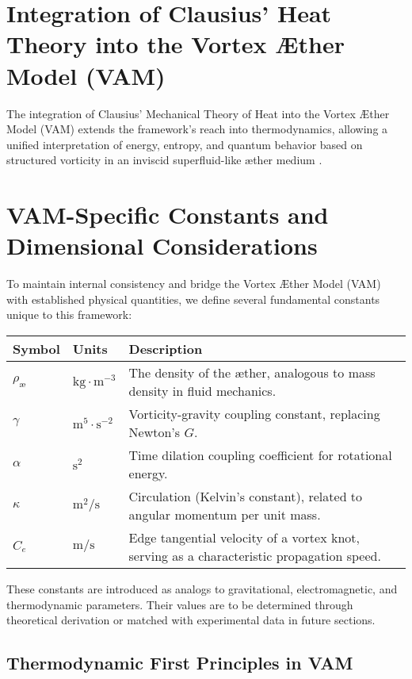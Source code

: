 

\section{Integration of Clausius' Heat Theory into the Vortex \AE ther Model (VAM)}

The integration of Clausius' Mechanical Theory of Heat into the Vortex \AE ther Model (VAM) extends the framework's reach into thermodynamics,
allowing a unified interpretation of energy, entropy, and quantum behavior based on structured vorticity in an inviscid superfluid-like \ae ther
medium \cite{clausius1865mechanical, maxwell1865electromagnetic, helmholtz1858integrals}.

\section{VAM-Specific Constants and Dimensional Considerations}

To maintain internal consistency and bridge the Vortex \AE ther Model (VAM) with established physical quantities, we define several fundamental constants unique to this framework:

\begin{tabular}{lll}
    \toprule
    Symbol & Units & Description \\
    \midrule
    $\rho_{\text{\ae}}$ & $\text{kg}\cdot\text{m}^{-3}$ & The density of the æther, analogous to mass density in fluid mechanics. \\
    $\gamma$ & $\text{m}^5 \cdot \text{s}^{-2}$ & Vorticity-gravity coupling constant, replacing Newton's $G$. \\
    $\alpha$ & $\text{s}^2$ & Time dilation coupling coefficient for rotational energy. \\
    $\kappa$ & $\text{m}^2/\text{s}$ & Circulation (Kelvin's constant), related to angular momentum per unit mass. \\
    $C_e$ & $\text{m}/\text{s}$ & Edge tangential velocity of a vortex knot, serving as a characteristic propagation speed. \\
    \bottomrule
\end{tabular}

These constants are introduced as analogs to gravitational, electromagnetic, and thermodynamic parameters. Their values are to be determined through theoretical derivation or matched with experimental data in future sections.

\subsection{Thermodynamic First Principles in VAM}


